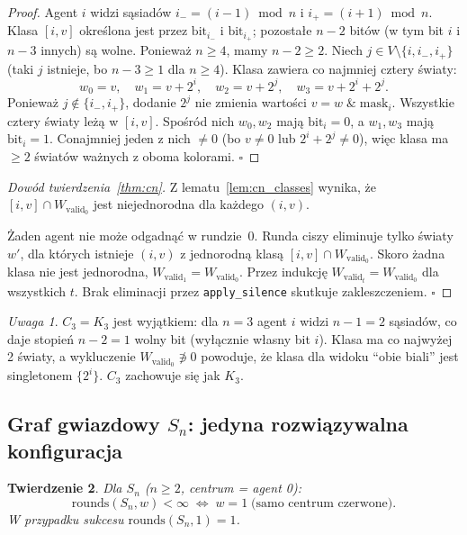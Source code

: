 \documentclass[12pt,a4paper]{article}
\theoremstyle{plain}
\newtheorem{theorem}{Twierdzenie}[section]
\theoremstyle{definition}
\theoremstyle{remark}
\newtheorem{remark}[theorem]{Uwaga}
\newcommand{\rounds}{\mathrm{rounds}}
\newcommand{\mask}{\mathrm{mask}}
\newcommand{\Wval}{W_{\mathrm{valid}}}
\begin{document}
\begin{proof}
Agent $i$ widzi sąsiadów $i_- = (i-1) \bmod n$ i $i_+ = (i+1) \bmod n$. Klasa $[i,v]$ określona jest przez $\mathrm{bit}_{i_-}$ i $\mathrm{bit}_{i_+}$; pozostałe $n-2$ bitów (w tym bit $i$ i $n-3$ innych) są wolne. Ponieważ $n \ge 4$, mamy $n-2 \ge 2$. Niech $j \in V \setminus \{i,i_-,i_+\}$ (taki $j$ istnieje, bo $n-3 \ge 1$ dla $n \ge 4$). Klasa zawiera co najmniej cztery światy:
$$w_0 = v,\quad w_1 = v+2^i,\quad w_2 = v+2^j,\quad w_3 = v+2^i+2^j.$$
Ponieważ $j \notin \{i_-,i_+\}$, dodanie $2^j$ nie zmienia wartości $v = w \;\&\; \mask_i$. Wszystkie cztery światy leżą w $[i,v]$. Spośród nich $w_0, w_2$ mają $\mathrm{bit}_i = 0$, a $w_1, w_3$ mają $\mathrm{bit}_i = 1$. Conajmniej jeden z nich $\ne 0$ (bo $v \ne 0$ lub $2^i+2^j \ne 0$), więc klasa ma $\ge 2$ światów ważnych z oboma kolorami. $\square$
\end{proof}

\begin{proof}[Dowód twierdzenia~\ref{thm:cn}]
Z lematu~\ref{lem:cn_classes} wynika, że $[i,v] \cap \Wval_0$ jest niejednorodna dla każdego $(i,v)$.

Żaden agent nie może odgadnąć w rundzie~0. Runda ciszy eliminuje tylko światy $w'$, dla których istnieje $(i,v)$ z jednorodną klasą $[i,v]\cap\Wval_0$. Skoro żadna klasa nie jest jednorodna, $\Wval_1 = \Wval_0$. Przez indukcję $\Wval_t = \Wval_0$ dla wszystkich $t$. Brak eliminacji przez \texttt{apply\_silence} skutkuje zakleszczeniem. $\square$
\end{proof}

\begin{remark}
$C_3 = K_3$ jest wyjątkiem: dla $n = 3$ agent $i$ widzi $n-1 = 2$ sąsiadów, co daje stopień $n-2=1$ wolny bit (wyłącznie własny bit $i$). Klasa ma co najwyżej 2 światy, a wykluczenie $\Wval_0 \not\ni 0$ powoduje, że klasa dla widoku ``obie biali'' jest singletonem $\{2^i\}$. $C_3$ zachowuje się jak $K_3$.
\end{remark}

\subsection{Graf gwiazdowy $S_n$: jedyna rozwiązywalna konfiguracja}

\begin{theorem}
\label{thm:star}
Dla $S_n$ ($n \ge 2$, centrum = agent 0):
$$\rounds(S_n,w) < \infty \;\iff\; w = 1 \;\text{(samo centrum czerwone).}$$
W przypadku sukcesu $\rounds(S_n,1) = 1$.
\end{theorem}
\end{document}
